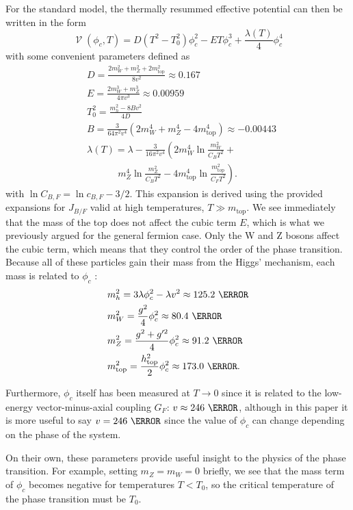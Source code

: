 \documentclass[%
 reprint,
nofootinbib,
 amsmath,amssymb,
 aps,
floatfix,
]{revtex4-1}
\DeclareMathOperator{\V}{\mathcal{V}}
\DeclareMathOperator{\mytab}{\,\,\,\,\,\,\,\,\,\,\,\,\,\,\,\,}
\begin{document}
For the standard model, the thermally resummed effective potential can then be written in the form \cite{quiros99,ah92}
\begin{equation}
    \V(\phi_c, T) = D\left(T^2-T_0^2\right)\phi_c^2 - ET \phi_c^3 + \frac{\lambda(T)}{4} \phi_c^4
\end{equation}
with some convenient parameters defined as
\begin{align}
    &D = \frac{2m_W^2+m_Z^2 + 2m_\text{top}^2}{8v^2} \approx 0.167 \\
    &E = \frac{2m_W^3 + m_Z^3}{4\pi v^3} \approx 0.00959 \\
    &T_0^2 = \frac{m_h^2-8Bv^2}{4D} \\
    &B = \frac{3}{64\pi^2 v^4} \left(2m_W^4+m_Z^4-4m_\text{top}^4\right) \approx -0.00443 \\
    &\lambda(T) = \lambda - \frac{3}{16\pi^2v^4} \left(2m_W^4 \ln \frac{m_W^2}{C_B T^2} + \right. \nonumber \\
    &\mytab \left. m_Z^4 \ln \frac{m_Z^2}{C_B T^2} - 4 m_\text{top}^4 \ln \frac{m_\text{top}^2}{C_FT^2} \right).
\end{align}
with $\ln C_{B,F} = \ln c_{B,F} - 3/2$. 
This expansion is derived using the provided expansions for $J_{B/F}$ valid at high temperatures, $T\gg m_\text{top}$.
We see immediately that the mass of the top does not affect the cubic term $E$, which is what we previously argued for the general fermion case.
Only the W and Z bosons affect the cubic term, which means that they control the order of the phase transition. 
Because all of these particles gain their mass from the Higgs' mechanism, each mass is related to $\phi_c$ \cite{pdg2018}:
\begin{align}
    &m_h^2 = 3\lambda \phi_c^2 - \lambda v^2 \approx 125.2~\GeV \\
    &m_W^2 = \frac{g^2}{4}\phi_c^2 \approx 80.4~\GeV \\
    &m_Z^2 = \frac{g^2+g'^2}{4}\phi_c^2 \approx 91.2~\GeV \\
    &m_\text{top}^2 = \frac{h_\text{top}^2}{2}\phi_c^2 \approx 173.0~\GeV.
\end{align}

Furthermore, $\phi_c$ itself has been measured at $T\rightarrow0$ since it is related to the low-energy vector-minus-axial coupling $G_F$: $v \approx 246~\GeV$, although in this paper it is more useful to say $v=246~\GeV$ since the value of $\phi_c$ can change depending on the phase of the system.

On their own, these parameters provide useful insight to the physics of the phase transition.
For example, setting $m_Z = m_W = 0$ briefly, we see that the mass term of $\phi_c$ becomes negative for temperatures $T < T_0$, so the critical temperature of the phase transition must be $T_0$.
\end{document}
